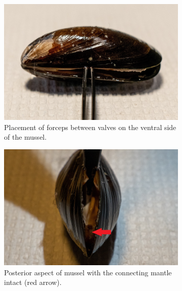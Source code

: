 \begin{figure}[H]
    \centering
    \begin{subfigure}[b]{.45\textwidth}
        \centering
        \includegraphics[width=\textwidth]{figures/Sampling technique/forceps square color.jpg}
        \caption{Placement of forceps between valves on the ventral side of the mussel.}
        \label{sfig:a}
    \end{subfigure}
    \hfill
    \begin{subfigure}[b]{.45\textwidth}
        \centering
        \includegraphics[width=\textwidth]{figures/Sampling technique/uncut color 3495.jpg}
        \caption{Posterior aspect of mussel with the connecting mantle intact (red arrow).}
        \label{sfig:b}
    \end{subfigure}
    \newline
    \begin{subfigure}[b]{.45\textwidth}

\end{subfigure}
\end{figure}
